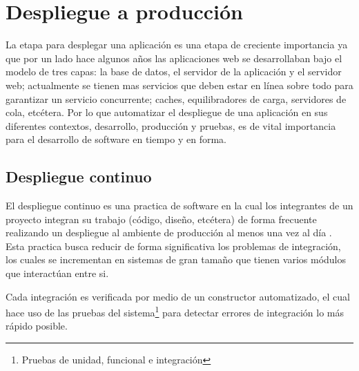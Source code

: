 \chapter{Despliegue a producción}

La etapa para desplegar una aplicación es una etapa de creciente importancia ya
que por un lado hace algunos años las aplicaciones web se desarrollaban bajo el
modelo de tres capas: la base de datos, el servidor de la aplicación y el servidor
web; actualmente se tienen mas servicios que deben estar en línea sobre todo para
garantizar un servicio concurrente; caches, equilibradores de carga, servidores
de cola, etcétera. Por lo que automatizar el despliegue de una aplicación en sus
diferentes contextos, desarrollo, producción y pruebas, es de vital importancia
para el desarrollo de software en tiempo y en forma.

\section{Despliegue continuo}

El despliegue continuo es una practica de software en la cual los integrantes
de un proyecto integran su trabajo (código, diseño, etcétera) de forma frecuente
realizando un despliegue al ambiente de producción al menos una vez al día
\cite{26_martin_fowler_ci}. Esta practica busca reducir de forma significativa los
problemas de integración, los cuales se incrementan en sistemas de gran tamaño
que tienen varios módulos que interactúan entre si.

Cada integración es verificada por medio de un constructor automatizado, el cual
hace uso de las pruebas del sistema\footnote{Pruebas de unidad, funcional e
  integración} para detectar errores de integración lo más rápido posible.
